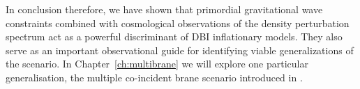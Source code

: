 




In conclusion therefore, we have shown that primordial gravitational wave constraints 
combined with cosmological observations of the density perturbation
spectrum act as a powerful discriminant of DBI inflationary models. 
They also serve as an important observational guide for identifying viable 
generalizations of the scenario. In Chapter~\ref{ch:multibrane} we will explore
one particular generalisation, the multiple co-incident brane scenario
introduced in .
